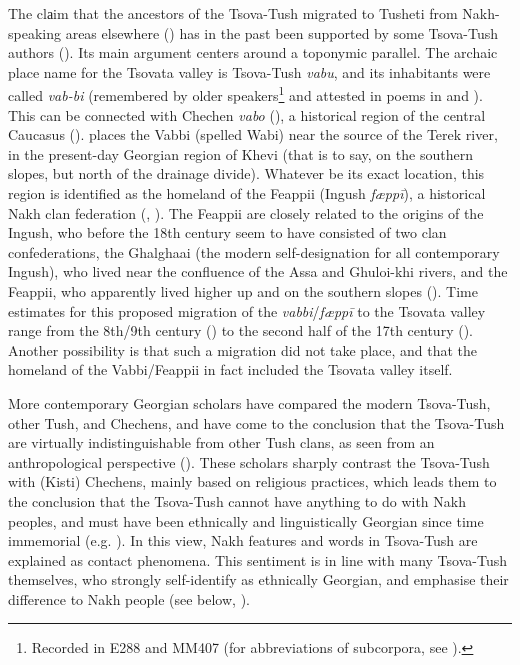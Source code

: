 The clаim that the ancestors of the Tsova-Tush migrated to Tusheti from Nakh-speaking areas elsewhere (\cites[]{dirr1909names,elanidze1988tusheti}) has in the past been supported by some Tsova-Tush authors (\cite{bukurauli1897moambe,Tsiskarov1846newspaper}). Its main argument centers around a toponymic parallel. The archaic place name for the Tsovata valley is Tsova-Tush \textit{vabu}, and its inhabitants were called \textit{vab-bi} (remembered by older speakers\footnote{Recorded in E288 and MM407 (for abbreviations of subcorpora, see ).} and attested in poems in \textcite{tsiskarovgloss} and \textcite{schiefner54}). This can be connected with Chechen \textit{vabo} (\cite{desheriev1963comparative}), a historical region of the central Caucasus (\cite{suleymanov1976topo}). \textcite{ellis1788memoir} places the Vabbi (spelled Wabi) near the source of the Terek river, in the present-day Georgian region of Khevi (that is to say, on the southern slopes, but north of the drainage divide). Whatever be its exact location, this region is identified as the homeland of the Feappii (Ingush \textit{fæppī}), a historical Nakh clan federation (\cites[82--83]{wixman1984peoples}, \cite{nichols11}). The Feappii are closely related to the origins of the Ingush, who before the 18th century seem to have consisted of two clan confederations, the Ghalghaai (the modern self-designation for all contemporary Ingush), who lived near the confluence of the Assa and Ghuloi-khi rivers, and the Feappii, who apparently lived higher up and on the southern slopes (\cites[]{nichols11}). Time estimates for this proposed migration of the \textit{vabbi}/\textit{fæppī} to the Tsovata valley range from the 8th/9th century (\cite[17]{makalatia1933tusheti}) to the second half of the 17th century (\cite{elanidze1988tusheti}). Another possibility is that such a migration did not take place, and that the homeland of the Vabbi/Feappii in fact included the Tsovata valley itself.

More contemporary Georgian scholars have compared the modern Tsova-Tush, other Tush, and Chechens, and have come to the conclusion that the Tsova-Tush are virtually indistinguishable from other Tush clans, as seen from an anthropological perspective (\cites[]{sharashidze1960anthro}). These scholars sharply contrast the Tsova-Tush with (Kisti) Chechens, mainly based on religious practices, which leads them to the conclusion that the Tsova-Tush cannot have anything to do with Nakh peoples, and must have been ethnically and linguistically Georgian since time immemorial (e.g. \cite{itonishvili2012tush}). In this view, Nakh features and words in Tsova-Tush are explained as contact phenomena. This sentiment is in line with many Tsova-Tush themselves, who strongly self-identify as ethnically Georgian, and emphasise their difference to Nakh people (see below, ).

